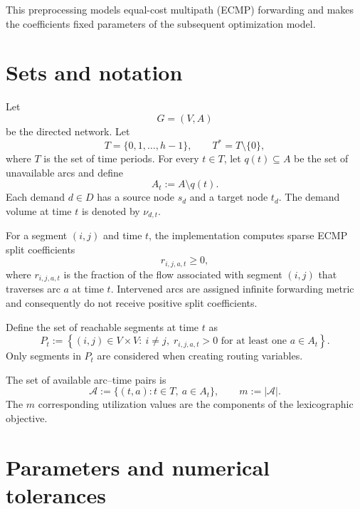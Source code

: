 \documentclass[11pt,a4paper]{article}
\newcommand{\Tstar}{T^{\ast}}
\newcommand{\Acal}{\mathcal{A}}
\begin{document}
This preprocessing models equal-cost multipath (ECMP) forwarding and makes the
coefficients fixed parameters of the subsequent optimization model.

\section{Sets and notation}

Let
\[
G=(V,A)
\]
be the directed network. Let
\[
T=\{0,1,\ldots,h-1\},
\qquad
\Tstar=T\setminus\{0\},
\]
where $T$ is the set of time periods. For every $t\in T$, let $q(t)\subseteq A$
be the set of unavailable arcs and define
\[
A_t:=A\setminus q(t).
\]
Each demand $d\in D$ has a source node $s_d$ and a target node $t_d$.
The demand volume at time $t$ is denoted by $\nu_{d,t}$.

For a segment $(i,j)$ and time $t$, the implementation computes sparse ECMP
split coefficients
\[
r_{i,j,a,t}\geq 0,
\]
where $r_{i,j,a,t}$ is the fraction of the flow associated with segment $(i,j)$
that traverses arc $a$ at time $t$. Intervened arcs are assigned infinite
forwarding metric and consequently do not receive positive split coefficients.

Define the set of reachable segments at time $t$ as
\[
P_t:=\left\{(i,j)\in V\times V:\ i\neq j,\;
 r_{i,j,a,t}>0\text{ for at least one }a\in A_t\right\}.
\]
Only segments in $P_t$ are considered when creating routing variables.

The set of available arc--time pairs is
\[
\Acal:=\{(t,a):t\in T,\ a\in A_t\},
\qquad m:=|\Acal|.
\]
The $m$ corresponding utilization values are the components of the
lexicographic objective.

\section{Parameters and numerical tolerances}
\end{document}
